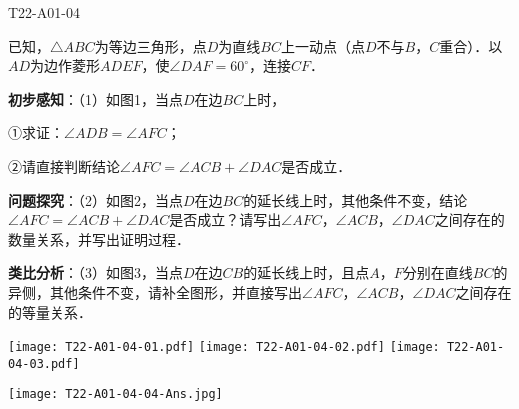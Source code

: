 \begin{defproblem}{T22-A01-04}%
\begin{onlyproblem}%
已知，$\triangle ABC$为等边三角形，点$D$为直线$BC$上一动点（点$D$不与$B$，$C$重合）．以$AD$为边作菱形$ADEF$，使$\angle DAF=60^{\circ }$，连接$CF$．

\textbf{初步感知}：（1）如图1，当点$D$在边$BC$上时，

①求证：$\angle ADB=\angle AFC$；

②请直接判断结论$\angle AFC=\angle ACB+\angle DAC$是否成立．

\textbf{问题探究}：（2）如图2，当点$D$在边$BC$的延长线上时，其他条件不变，结论$\angle AFC=\angle ACB+\angle DAC$是否成立？请写出$\angle AFC$，$\angle ACB$，$\angle DAC$之间存在的数量关系，并写出证明过程．

\textbf{类比分析}：（3）如图3，当点$D$在边$CB$的延长线上时，且点$A$，$F$分别在直线$BC$的异侧，其他条件不变，请补全图形，并直接写出$\angle AFC$，$\angle ACB$，$\angle DAC$之间存在的等量关系．
\begin{center}
\texttt{[image: T22-A01-04-01.pdf]}\qquad
\texttt{[image: T22-A01-04-02.pdf]}\qquad
\texttt{[image: T22-A01-04-03.pdf]}
\end{center}

\end{onlyproblem}%
\begin{onlysolution}%
\begin{center}
\texttt{[image: T22-A01-04-04-Ans.jpg]}
\end{center}
\end{onlysolution}%
\end{defproblem}






